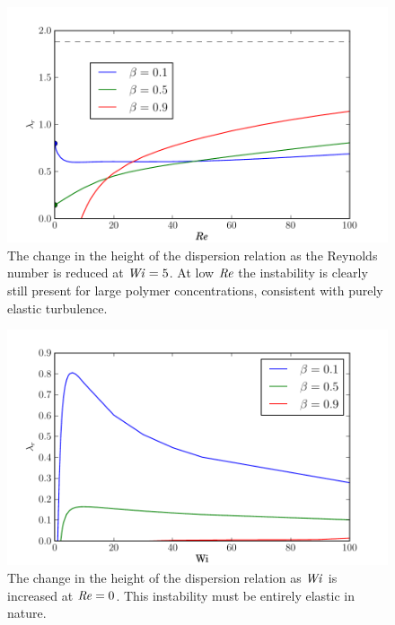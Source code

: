 \documentclass{jfm}
\newcommand\Wi{\mbox{\textit{Wi}}}
\newcommand\Rey{\mbox{\textit{Re}}}  %
\begin{document}
\begin{figure}
    \includegraphics[width=\textwidth]{KH_low_Wi_vary_Re}
    \caption{The change in the height of the dispersion relation as the Reynolds number is reduced at $\Wi=5$. At low $\Rey$ the instability is clearly still present for large polymer concentrations, consistent with purely elastic turbulence. }
    \label{fig:KH_reduce_Re}
\end{figure}
\begin{figure}
    \includegraphics[width=\textwidth]{KH_low_Re_vary_Wi}
    \caption{The change in the height of the dispersion relation as $\Wi$ is increased at $\Rey = 0$. This instability must be entirely elastic in nature. }
    \label{fig:KH_purely_elastic}
\end{figure}
\end{document}
